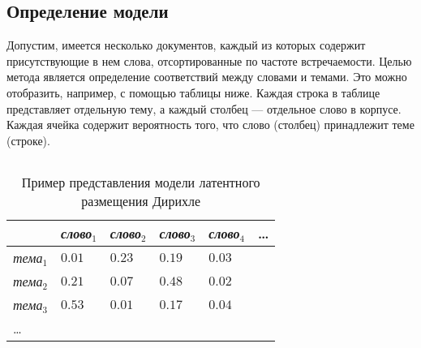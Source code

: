 \subsection{Определение модели}

Допустим, имеется несколько документов, каждый из которых содержит присутствующие в нем слова, отсортированные по частоте встречаемости. Целью метода является определение соответствий между словами и темами. Это можно отобразить, например, с помощью таблицы ниже. Каждая строка в таблице представляет отдельную тему, а каждый столбец --- отдельное слово в корпусе. Каждая ячейка содержит вероятность того, что слово (столбец) принадлежит теме (строке).

$ $

\begin{table}[h]
\centering
\begin{tabular}{ | l | l | l | l | l | l |}
\hline
 & \textit{слово}$_1$ & \textit{слово}$_2$  & \textit{слово}$_3$  & \textit{слово}$_4$  & \ldots \\ \hline
\textit{тема}$_1$ & $0.01$ & $0.23$ & $0.19$ & $0.03$ & \\ \hline 
\textit{тема}$_2$ & $0.21$ & $0.07$ & $0.48$ & $0.02$ & \\ \hline 
\textit{тема}$_3$ & $0.53$ & $0.01$ & $0.17$ & $0.04$ & \\ \hline 
\ldots & & & & & \\ \hline 
\end{tabular}
\caption{Пример представления модели латентного размещения Дирихле}
\end{table}
